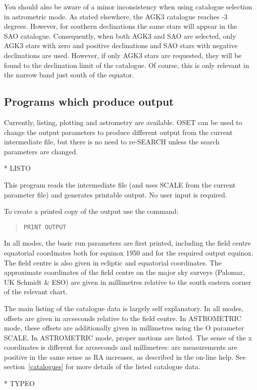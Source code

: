 \documentclass{article}
\begin{document}
You should also be aware of a minor inconsistency when using catalogue selection
in astrometric mode.
As stated elsewhere, the AGK3 catalogue reaches -3 degrees.
However, for southern declinations the same stars will appear in the SAO
catalogue.
Consequently, when both AGK3 and SAO are selected, only AGK3 stars with zero and
positive declinations and SAO stars with negative declinations are used.
However, if only AGK3 stars are requested, they will be found to the declination
limit of the catalogue.
Of course, this is only relevant in the narrow band just south of the equator.
\subsection{Programs which produce output}
\label{output}
Currently, listing, plotting and astrometry are available.
OSET can be used to change the output parameters to produce different output
from the current intermediate file, but there is no need to re-SEARCH unless the
search parameters are changed.

* LISTO

This program reads the intermediate file (and uses SCALE from the current
parameter file) and generates printable output.
No user input is required.

To create a printed copy of the output use the command:
\begin{quote}
{\tt PRINT OUTPUT}
\end{quote}
In all modes, the basic run parameters are first printed, including the field
centre equatorial coordinates both for equinox 1950 and for the required output
equinox.
The field centre is also given in ecliptic and equatorial coordinates.
The approximate coordinates of the field centre on the major sky surveys
(Palomar, UK Schmidt \& ESO) are given in millimetres relative to the south
eastern corner of the relevant chart.

The main listing of the catalogue data is largely self explanatory.
In all modes, offsets are given in arcseconds relative to the field centre.
In ASTROMETRIC mode, these offsets are additionally given in millimetres using
the O parameter SCALE.
In ASTROMETRIC mode, proper motions are listed.
The sense of the x coordinates is different for arcseconds and millimetres:
arc measurements are positive in the same sense as RA increases, as described in
the on-line help.
See section~\ref{catalogues} for more details of the listed catalogue data.

* TYPEO
\end{document}
